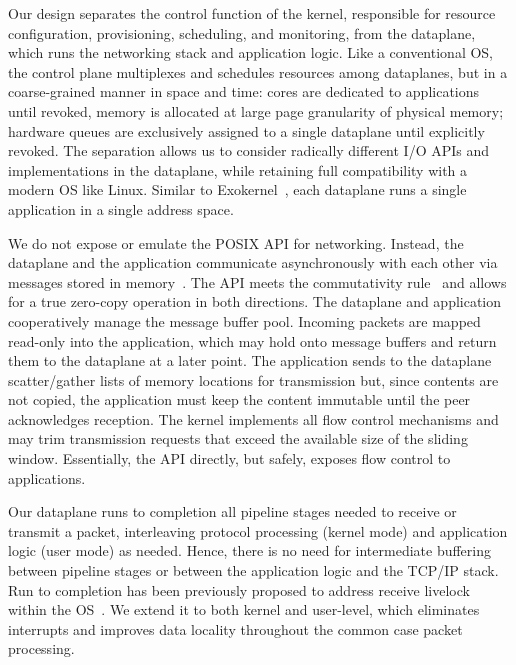 Our design separates the control function of the kernel, responsible
for resource configuration, provisioning, scheduling, and monitoring,
from the dataplane, which runs the networking stack and application
logic.  Like a conventional OS, the control plane multiplexes and
schedules resources among dataplanes, but in a coarse-grained manner
in space and time: cores are dedicated to applications until revoked,
memory is allocated at large page granularity of physical memory;
hardware queues are exclusively assigned to a single dataplane until
explicitly revoked.  The separation allows us to consider radically
different I/O APIs and implementations in the dataplane, while
retaining full compatibility with a modern OS like Linux.  Similar to
Exokernel~\cite{DBLP:conf/sosp/EnglerKO95}, each dataplane runs a
single application in a single address space. 


 We do
not expose or emulate the POSIX API for networking.  Instead, the
dataplane and the application communicate asynchronously with each
other via messages stored in
memory~\cite{DBLP:conf/osdi/HanMCR12,DBLP:journals/cacm/Rizzo12}.  The API meets the
commutativity rule~\cite{DBLP:conf/sosp/ClementsKZMK13} and allows for
a true zero-copy operation in both directions. The dataplane and
application cooperatively manage the message buffer pool. Incoming
packets are mapped read-only into the application, which may hold onto
message buffers and return them to the dataplane at a later point.
The application sends to the dataplane scatter/gather lists of memory
locations for transmission but, since contents are not copied, the
application must keep the content immutable until the peer
acknowledges reception. The kernel implements all flow control
mechanisms and may trim transmission requests that exceed the
available size of the sliding window.  Essentially, the API directly,
but safely, exposes flow control to applications.


 Our dataplane
runs to completion all pipeline stages needed to receive or transmit a
packet, interleaving protocol processing (kernel mode) and application
logic (user mode) as needed. Hence, there is no need for intermediate
buffering between pipeline stages or between the application logic and
the TCP/IP stack. Run to completion has been previously proposed to
address receive livelock within the OS~\cite{receive-livelock}. We
extend it to both kernel and user-level, which eliminates interrupts
and improves data locality throughout the common case packet
processing.

